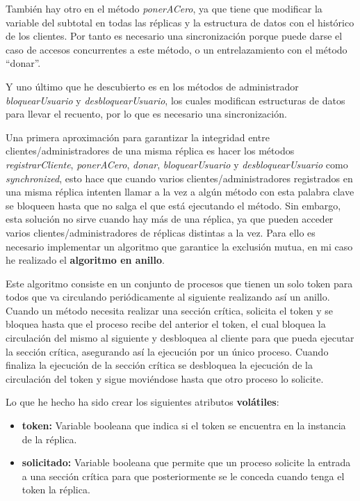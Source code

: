 \documentclass{article}
\begin{document}
También hay otro en el método \textit{ponerACero}, ya que tiene que modificar la variable del subtotal en todas las réplicas y la estructura de datos con el histórico de los clientes. Por tanto es necesario una sincronización porque puede darse el caso de accesos concurrentes a este método, o un entrelazamiento con el método ``donar''.

Y uno último que he descubierto es en los métodos de administrador \textit{bloquearUsuario} y \textit{desbloquearUsuario}, los cuales modifican estructuras de datos para llevar el recuento, por lo que es necesario una sincronización.

\bigskip

Una primera aproximación para garantizar la integridad entre clientes/administradores de una misma réplica es hacer los métodos \textit{registrarCliente}, \textit{ponerACero}, \textit{donar}, \textit{bloquearUsuario} y \textit{desbloquearUsuario} como \textit{synchronized}, esto hace que cuando varios clientes/administradores registrados en una misma réplica intenten llamar a la vez a algún método con esta palabra clave se bloqueen hasta que no salga el que está ejecutando el método. Sin embargo, esta solución no sirve cuando hay más de una réplica, ya que pueden acceder varios clientes/administradores de réplicas distintas a la vez. Para ello es necesario implementar un algoritmo que garantice la exclusión mutua, en mi caso he realizado el \textbf{algoritmo en anillo}.

\bigskip

Este algoritmo consiste en un conjunto de procesos que tienen un solo token para todos que va circulando periódicamente al siguiente realizando así un anillo. Cuando un método necesita realizar una sección crítica, solicita el token y se bloquea hasta que el proceso recibe del anterior el token, el cual bloquea la circulación del mismo al siguiente y desbloquea al cliente para que pueda ejecutar la sección crítica, asegurando así la ejecución por un único proceso. Cuando finaliza la ejecución de la sección crítica se desbloquea la ejecución de la circulación del token y sigue moviéndose hasta que otro proceso lo solicite.

\bigskip

Lo que he hecho ha sido crear los siguientes atributos \textbf{volátiles}:

\begin{itemize}
    \item \textbf{token: }Variable booleana que indica si el token se encuentra en la instancia de la réplica.
    \item \textbf{solicitado: }Variable booleana que permite que un proceso solicite la entrada a una sección crítica para que posteriormente se le conceda cuando tenga el token la réplica.
\end{itemize}
\end{document}
